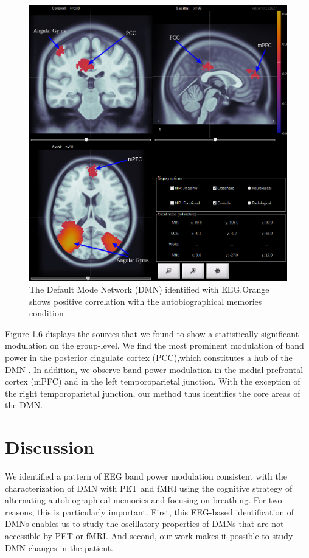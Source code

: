 \begin{figure}
    \centering
    \includegraphics[width=15cm]{Pictures/result1.png}
    \caption{The Default Mode Network (DMN) identified with EEG.Orange shows positive correlation with
the autobiographical memories condition}
    \label{fig:my_label3}
\end{figure}
Figure 1.6 displays the sources that we found to show a statistically significant modulation on the group-level. We find the most prominent modulation of band power in the posterior cingulate cortex (PCC),which constitutes a hub of the DMN . In addition, we observe band power modulation in the medial prefrontal cortex (mPFC) and in the left temporoparietal junction. With the exception of the right temporoparietal junction, our method thus identifies the core areas of the DMN.

\section{Discussion}
We identified a pattern of EEG band power modulation consistent with the characterization of  DMN with PET and fMRI using the cognitive strategy of alternating autobiographical memories and focusing on breathing. For two reasons, this is particularly important. First, this EEG-based identification of DMNs enables us to study the oscillatory properties of DMNs that are not accessible by PET or fMRI. And second, our work makes it possible to study DMN changes in the patient.

